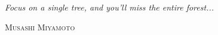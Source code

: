 
\vspace*{\fill}

\Large\textit{Focus on a single tree, and you'll miss the entire forest...}

\bigskip

\begin{flushright}
    \sffamily\scshape Musashi Miyamoto
\end{flushright}

\normalfont\normalsize

\vspace*{\fill}
